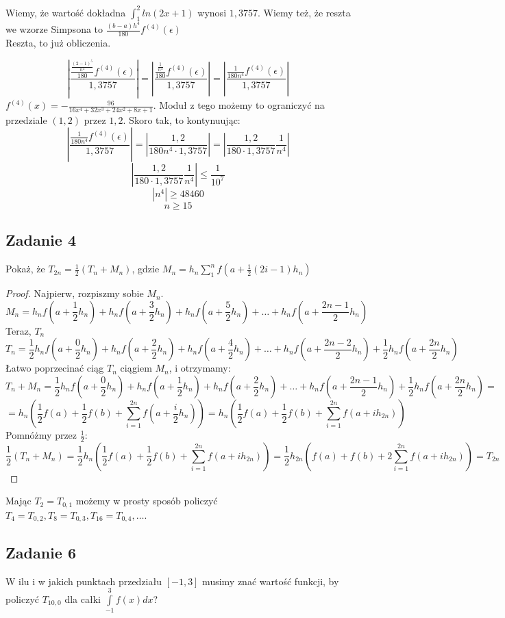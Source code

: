 \documentclass[a4paper]{article}
\begin{document}
Wiemy, że wartość dokładna $\int_1^2 ln(2x+1)$ wynosi $1,3757$. Wiemy też, że reszta we wzorze Simpsona to $\frac{(b-a)h^4}{180}f^{(4)}(\epsilon)$  \\
Reszta, to już obliczenia.

$$|\frac{\frac{\frac{(2-1)^5}{n^4}}{180}f^{(4)}(\epsilon)}{1,3757}| = |\frac{\frac{\frac{1}{n^4}}{180}f^{(4)}(\epsilon)}{1,3757}| = |\frac{\frac{1}{180n^4}f^{(4)}(\epsilon)}{1,3757}| $$
$f^{(4)}(x)=-\frac{96}{16x^4+32x^3 + 24x^2 + 8x+1}$. Moduł z tego możemy to ograniczyć na przedziale $(1,2)$ przez $1,2$. Skoro tak, to kontynuując:
$$|\frac{\frac{1}{180n^4}f^{(4)}(\epsilon)}{1,3757}|=|\frac{1,2}{180n^4 \cdot 1,3757}| = |\frac{1,2}{180 \cdot 1,3757} \frac{1}{n^4}|$$
$$|\frac{1,2}{180 \cdot 1,3757} \frac{1}{n^4}| \leq \frac{1}{10^7} $$
$$|n^4| \geq 48460	$$
$$n \geq 15 $$

\subsection*{Zadanie 4}
Pokaż, że $T_{2n} = \frac{1}{2}(T_n+M_n)$, gdzie $M_n=h_n\sum\limits_1^n f(a+\frac{1}{2}(2i-1)h_n)$\\
\begin{proof}
Najpierw, rozpiszmy sobie $M_n$.\\
$$M_n=h_nf(a+\frac{1}{2}h_n) + h_nf(a+\frac{3}{2}h_n) + h_nf(a+\frac{5}{2}h_n) + \dots + h_nf(a+\frac{2n-1}{2}h_n) $$
Teraz, $T_n$
$$T_n=\frac{1}{2}h_nf(a+\frac{0}{2}h_n)+h_nf(a+\frac{2}{2}h_n)+h_nf(a+\frac{4}{2}h_n)+\dots + h_nf(a+\frac{2n-2}{2}h_n)+\frac{1}{2}h_nf(a+\frac{2n}{2}h_n) $$
Łatwo poprzecinać ciąg $T_n$ ciągiem $M_n$, i otrzymamy:
$$T_n+M_n=\frac{1}{2}h_nf(a+\frac{0}{2}h_n) +  h_nf(a+\frac{1}{2}h_n) + h_nf(a+\frac{2}{2}h_n) +\dots + h_nf(a+\frac{2n-1}{2}h_n) + \frac{1}{2}h_nf(a+\frac{2n}{2}h_n)=$$
$$=h_n\left( \frac{1}{2}f(a) + \frac{1}{2}f(b) + \sum\limits_{i=1}^{2n}f(a+\frac{i}{2}h_n) \right) = h_n\left( \frac{1}{2}f(a) + \frac{1}{2}f(b) + \sum\limits_{i=1}^{2n}f(a+ih_{2n}) \right) $$
Pomnóżmy przez $\frac{1}{2}$:
$$\frac{1}{2}(T_n+M_n) = \frac{1}{2}h_n\left( \frac{1}{2}f(a) + \frac{1}{2}f(b) + \sum\limits_{i=1}^{2n}f(a+ih_{2n}) \right) = \frac{1}{2}h_{2n}\left( f(a) + f(b) + 2\sum\limits_{i=1}^{2n}f(a+ih_{2n}) \right)=T_{2n} $$
\end{proof}

Mając $T_{2}=T_{0,1}$ możemy w prosty sposób policzyć $T_4=T_{0,2}, T_8=T_{0,3}, T_{16}=T_{0,4}, \dots$.

\subsection*{Zadanie 6}
W ilu i w jakich punktach przedziału $[-1,3]$ musimy znać wartość funkcji, by policzyć $T_{10,0}$ dla całki $\int\limits_{-1}^3 f(x) dx$?
\end{document}
